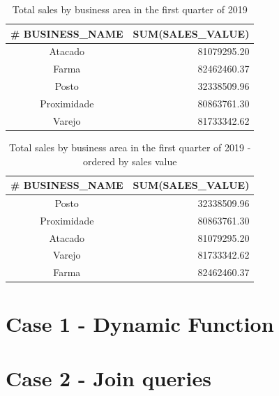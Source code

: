\documentclass[a4paper, 12pt]{article}
\begin{document}
\begin{table}[htb]
\centering
\begin{tabular}{cr}
\hline
\multicolumn{1}{l}{\# BUSINESS\_NAME} & \multicolumn{1}{l}{SUM(SALES\_VALUE)} \\ \hline
Atacado                               & 81079295.20                           \\ \hline
Farma                                 & 82462460.37                           \\ \hline
Posto                                 & 32338509.96                           \\ \hline
Proximidade                           & 80863761.30                           \\ \hline
Varejo                                & 81733342.62                           \\ \hline
\end{tabular}
\caption{Total sales by business area in the first quarter of 2019}
\label{tab:total_sales}
\end{table}

\begin{table}[htb]
\centering
\begin{tabular}{cr}
\hline
\# BUSINESS\_NAME & SUM(SALES\_VALUE) \\ \hline
Posto             & 32338509.96       \\ \hline
Proximidade       & 80863761.30       \\ \hline
Atacado           & 81079295.20       \\ \hline
Varejo            & 81733342.62       \\ \hline
Farma             & 82462460.37       \\ \hline
\end{tabular}
\caption{Total sales by business area in the first quarter of 2019 - ordered by sales value}
\label{tab:total_sales_ordered}
\end{table}

\newpage



\section{Case 1 - Dynamic Function}



\newpage
\section{Case 2 - Join queries}
\end{document}
